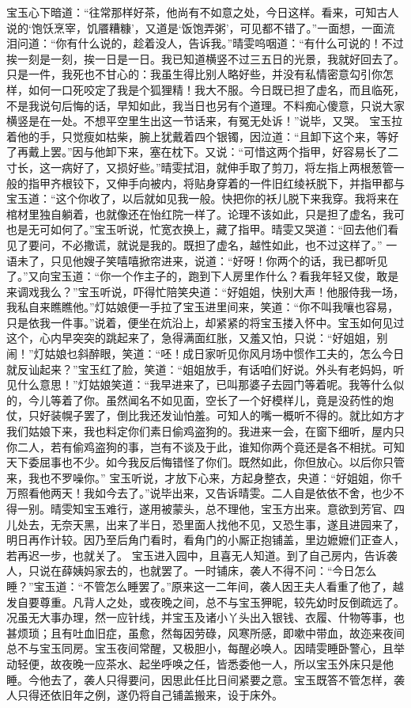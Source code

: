 \documentclass[12pt,oneside]{book}
\begin{document}
宝玉心下暗道：“往常那样好茶，他尚有不如意之处，今日这样。看来，可知古人说的‘饱饫烹宰，饥餍糟糠’，又道是‘饭饱弄粥’，可见都不错了。”一面想，一面流泪问道：“你有什么说的，趁着没人，告诉我。”晴雯呜咽道：“有什么可说的！不过挨一刻是一刻，挨一日是一日。我已知道横竖不过三五日的光景，我就好回去了。只是一件，我死也不甘心的：我虽生得比别人略好些，并没有私情密意勾引你怎样，如何一口死咬定了我是个狐狸精！我大不服。今日既已担了虚名，而且临死，不是我说句后悔的话，早知如此，我当日也另有个道理。不料痴心傻意，只说大家横竖是在一处。不想平空里生出这一节话来，有冤无处诉！”说毕，又哭。
宝玉拉着他的手，只觉瘦如枯柴，腕上犹戴着四个银镯，因泣道：“且卸下这个来，等好了再戴上罢。”因与他卸下来，塞在枕下。又说：“可惜这两个指甲，好容易长了二寸长，这一病好了，又损好些。”晴雯拭泪，就伸手取了剪刀，将左指上两根葱管一般的指甲齐根铰下，又伸手向被内，将贴身穿着的一件旧红绫袄脱下，并指甲都与宝玉道：“这个你收了，以后就如见我一般。快把你的袄儿脱下来我穿。我将来在棺材里独自躺着，也就像还在怡红院一样了。论理不该如此，只是担了虚名，我可也是无可如何了。”宝玉听说，忙宽衣换上，藏了指甲。晴雯又哭道：“回去他们看见了要问，不必撒谎，就说是我的。既担了虚名，越性如此，也不过这样了。”
一语未了，只见他嫂子笑嘻嘻掀帘进来，说道：“好呀！你两个的话，我已都听见了。”又向宝玉道：“你一个作主子的，跑到下人房里作什么？看我年轻又俊，敢是来调戏我么？”宝玉听说，吓得忙陪笑央道：“好姐姐，快别大声！他服侍我一场，我私自来瞧瞧他。”灯姑娘便一手拉了宝玉进里间来，笑道：“你不叫我嚷也容易，只是依我一件事。”说着，便坐在炕沿上，却紧紧的将宝玉搂入怀中。宝玉如何见过这个，心内早突突的跳起来了，急得满面红胀，又羞又怕，只说：“好姐姐，别闹！”灯姑娘乜斜醉眼，笑道：“呸！成日家听见你风月场中惯作工夫的，怎么今日就反讪起来？”宝玉红了脸，笑道：“姐姐放手，有话咱们好说。外头有老妈妈，听见什么意思！”灯姑娘笑道：“我早进来了，已叫那婆子去园门等着呢。我等什么似的，今儿等着了你。虽然闻名不如见面，空长了一个好模样儿，竟是没药性的炮仗，只好装幌子罢了，倒比我还发讪怕羞。可知人的嘴一概听不得的。就比如方才我们姑娘下来，我也料定你们素日偷鸡盗狗的。我进来一会，在窗下细听，屋内只你二人，若有偷鸡盗狗的事，岂有不谈及于此，谁知你两个竟还是各不相扰。可知天下委屈事也不少。如今我反后悔错怪了你们。既然如此，你但放心。以后你只管来，我也不罗噪你。”
宝玉听说，才放下心来，方起身整衣，央道：“好姐姐，你千万照看他两天！我如今去了。”说毕出来，又告诉晴雯。二人自是依依不舍，也少不得一别。晴雯知宝玉难行，遂用被蒙头，总不理他，宝玉方出来。意欲到芳官、四儿处去，无奈天黑，出来了半日，恐里面人找他不见，又恐生事，遂且进园来了，明日再作计较。因乃至后角门看时，看角门的小厮正抱铺盖，里边嬷嬷们正查人，若再迟一步，也就关了。
宝玉进入园中，且喜无人知道。到了自己房内，告诉袭人，只说在薛姨妈家去的，也就罢了。一时铺床，袭人不得不问：“今日怎么睡？”宝玉道：“不管怎么睡罢了。”原来这一二年间，袭人因王夫人看重了他了，越发自要尊重。凡背人之处，或夜晚之间，总不与宝玉狎昵，较先幼时反倒疏远了。况虽无大事办理，然一应针线，并宝玉及诸小丫头出入银钱、衣履、什物等事，也甚烦琐；且有吐血旧症，虽愈，然每因劳碌，风寒所感，即嗽中带血，故迩来夜间总不与宝玉同房。宝玉夜间常醒，又极胆小，每醒必唤人。因晴雯睡卧警心，且举动轻便，故夜晚一应茶水、起坐呼唤之任，皆悉委他一人，所以宝玉外床只是他睡。今他去了，袭人只得要问，因思此任比日间紧要之意。宝玉既答不管怎样，袭人只得还依旧年之例，遂仍将自己铺盖搬来，设于床外。
\end{document}
